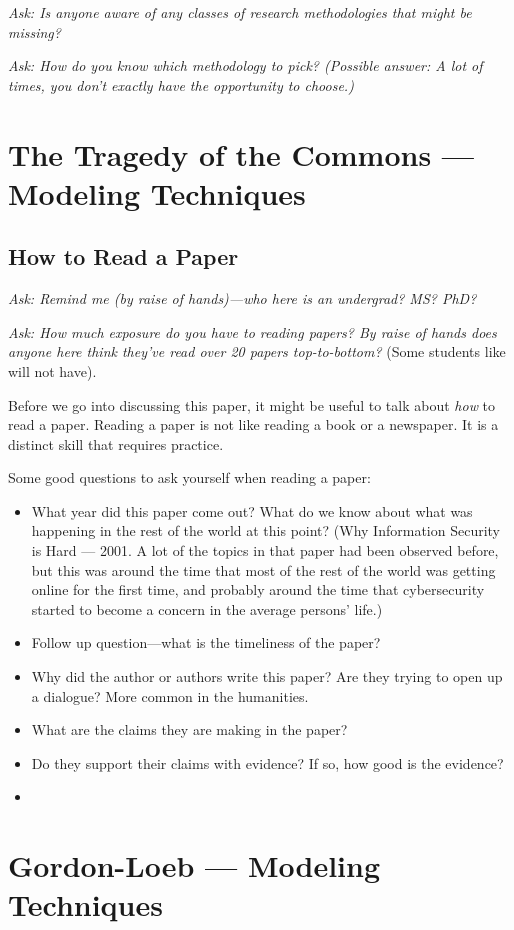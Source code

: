 \documentclass[11pt]{article}
\begin{document}
{\it Ask: Is anyone aware of any classes of research methodologies that might be missing? }

{\it Ask: How do you know which methodology to pick? (Possible answer: A lot of times, you don't exactly have the opportunity to choose.)}




\section{The Tragedy of the Commons --- Modeling Techniques}

\subsection{How to Read a Paper}

{\it Ask: Remind me (by raise of hands)---who here is an undergrad? MS? PhD?}

{\it Ask: How much exposure do you have to reading papers? By raise of hands does anyone here think they've read over 20 papers top-to-bottom?} (Some students like will not have).

Before we go into discussing this paper, it might be useful to talk about {\it how} to read a paper. Reading a paper is not like reading a book or a newspaper. It is a distinct skill that requires practice.

Some good questions to ask yourself when reading a paper:

\begin{itemize}
    \item What year did this paper come out? What do we know about what was happening in the rest of the world at this point? (Why Information Security is Hard --- 2001. A lot of the topics in that paper had been observed before, but this was around the time that most of the rest of the world was getting online for the first time, and probably around the time that cybersecurity started to become a concern in the average persons' life.)
    \item Follow up question---what is the timeliness of the paper?
    \item Why did the author or authors write this paper? Are they trying to open up a dialogue? More common in the humanities.
    \item What are the claims they are making in the paper?
    \item Do they support their claims with evidence? If so, how good is the evidence?
    \item 
\end{itemize}


\section{Gordon-Loeb --- Modeling Techniques}
\end{document}
